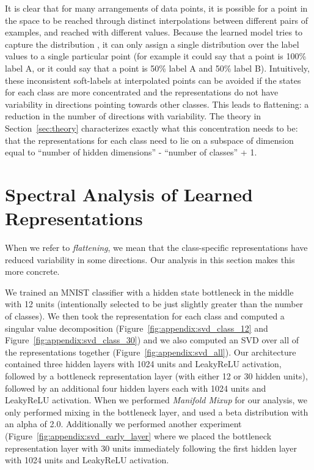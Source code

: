\documentclass{article} \usepackage[preprint]{nips_2018}
\newcommand{\manifoldmixup}{\textit{Manifold Mixup}}
\begin{document}
{It is clear that for many arrangements of data points, it is possible for a point in the space to be reached through distinct interpolations between different pairs of examples, and reached with different  values.  Because the learned model tries to capture the distribution , it can only assign a single distribution over the label values to a single particular point (for example it could say that a point is 100\% label A, or it could say that a point is 50\% label A and 50\% label B).  Intuitively, these inconsistent soft-labels at interpolated points can be avoided if the states for each class are more concentrated and the representations do not have variability in directions pointing towards other classes.  This leads to flattening: a reduction in the number of directions with variability.  The theory in Section~\ref{sec:theory} characterizes exactly what this concentration needs to be: that the representations for each class need to lie on a subspace of dimension equal to ``number of hidden dimensions'' - ``number of classes'' + 1.  



\section{Spectral Analysis of Learned Representations}
\label{appendix:sec:flattening}

When we refer to \textit{flattening}, we mean that the class-specific representations have reduced variability in some directions.  Our analysis in this section makes this more concrete.

We trained an MNIST classifier with a hidden state bottleneck in the middle with 12 units (intentionally selected to be just slightly greater than the number of classes).  We then took the representation for each class and computed a singular value decomposition (Figure~\ref{fig:appendix:svd_class_12} and Figure~\ref{fig:appendix:svd_class_30}) and we also computed an SVD over all of the representations together (Figure~\ref{fig:appendix:svd_all}).  Our architecture contained three hidden layers with 1024 units and LeakyReLU activation, followed by a bottleneck representation layer (with either 12 or 30 hidden units), followed by an additional four hidden layers each with 1024 units and LeakyReLU activation.  When we performed \manifoldmixup{} for our analysis, we only performed mixing in the bottleneck layer, and used a beta distribution with an alpha of 2.0.  Additionally we performed another experiment (Figure~\ref{fig:appendix:svd_early_layer} where we placed the bottleneck representation layer with 30 units immediately following the first hidden layer with 1024 units and LeakyReLU activation.  

}
\end{document}
